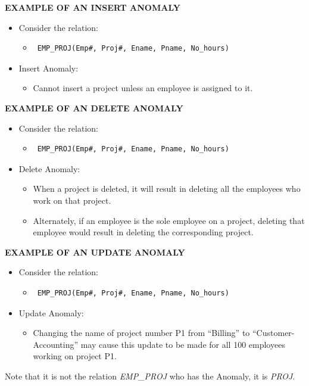\textbf{EXAMPLE OF AN INSERT ANOMALY}
\begin{itemize}
    \item Consider the relation:
    \begin{itemize}
        \item  \begin{verbatim} EMP_PROJ(Emp#, Proj#, Ename, Pname, No_hours) \end{verbatim}
    \end{itemize}
    \item Insert Anomaly:
    \begin{itemize}
        \item Cannot insert a project unless an employee is
            assigned to it.
    \end{itemize}
\end{itemize}


\textbf{EXAMPLE OF AN DELETE ANOMALY}
\begin{itemize}
    \item Consider the relation:
    \begin{itemize}
        \item  \begin{verbatim} EMP_PROJ(Emp#, Proj#, Ename, Pname, No_hours) \end{verbatim}
    \end{itemize}
    \item Delete Anomaly:
    \begin{itemize}
        \item When a project is deleted, it will result in deleting
            all the employees who work on that project.
        \item Alternately, if an employee is the sole employee
            on a project, deleting that employee would result in
            deleting the corresponding project.
    \end{itemize}
\end{itemize}


\textbf{EXAMPLE OF AN UPDATE ANOMALY}
\begin{itemize}
    \item Consider the relation:
    \begin{itemize}
    \item
\begin{verbatim} EMP_PROJ(Emp#, Proj#, Ename, Pname, No_hours) \end{verbatim}
    \end{itemize}
    \item Update Anomaly:
    \begin{itemize}
        \item Changing the name of project number P1 from
            “Billing” to “Customer-Accounting” may cause this
            update to be made for all 100 employees working
            on project P1.
    \end{itemize}
\end{itemize}
Note that it is not the relation \textit{EMP\_PROJ}
who has the Anomaly, it is \textit{PROJ}.

